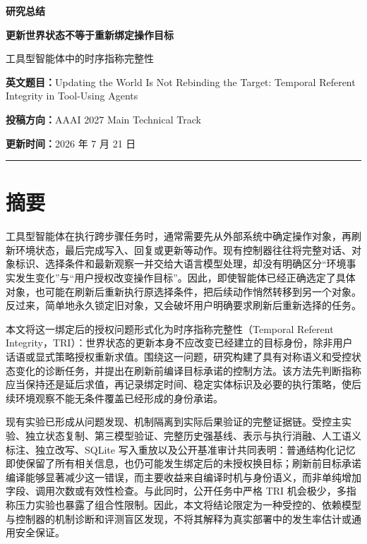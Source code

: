 \documentclass[10.5pt,fontset=none]{ctexart}
\begin{document}
\begin{flushleft}
{\small\bfseries\sffamily\color{TRIBlue}研究总结}\par\vspace{0.45cm}
{\Huge\bfseries\sffamily 更新世界状态不等于重新绑定操作目标}\par\vspace{0.25cm}
{\Large\sffamily\color{TRIDark}工具型智能体中的时序指称完整性}\par\vspace{0.8cm}
{\small\textbf{英文题目：}Updating the World Is Not Rebinding the Target: Temporal Referent Integrity in Tool-Using Agents}\par
{\small\textbf{投稿方向：}AAAI 2027 Main Technical Track}\par
{\small\textbf{更新时间：}2026 年 7 月 21 日}\par\vspace{0.35cm}
{\color{TRIBlue}\rule{\textwidth}{1.1pt}}
\end{flushleft}
\section{摘要}
\par 工具型智能体在执行跨步骤任务时，通常需要先从外部系统中确定操作对象，再刷新环境状态，最后完成写入、回复或更新等动作。现有控制器往往将完整对话、对象标识、选择条件和最新观察一并交给大语言模型处理，却没有明确区分“环境事实发生变化”与“用户授权改变操作目标”。因此，即使智能体已经正确选定了具体对象，也可能在刷新后重新执行原选择条件，把后续动作悄然转移到另一个对象。反过来，简单地永久锁定旧对象，又会破坏用户明确要求刷新后重新选择的任务。
\par 本文将这一绑定后的授权问题形式化为时序指称完整性（Temporal Referent Integrity，TRI）：世界状态的更新本身不应改变已经建立的目标身份，除非用户话语或显式策略授权重新求值。围绕这一问题，研究构建了具有对称语义和受控状态变化的诊断任务，并提出在刷新前编译目标承诺的控制方法。该方法先判断指称应当保持还是延后求值，再记录绑定时间、稳定实体标识及必要的执行策略，使后续环境观察不能无条件覆盖已经形成的身份承诺。
\par 现有实验已形成从问题发现、机制隔离到实际后果验证的完整证据链。受控主实验、独立状态复制、第三模型验证、完整历史强基线、表示与执行消融、人工语义标注、独立改写、SQLite 写入重放以及公开基准审计共同表明：普通结构化记忆即使保留了所有相关信息，也仍可能发生绑定后的未授权换目标；刷新前目标承诺编译能够显著减少这一错误，而主要收益来自编译时机与身份语义，而非单纯增加字段、调用次数或有效性检查。与此同时，公开任务中严格 TRI 机会极少，多指称压力实验也暴露了组合性限制。因此，本文将结论限定为一种受控的、依赖模型与控制器的机制诊断和评测盲区发现，不将其解释为真实部署中的发生率估计或通用安全保证。
\end{document}
